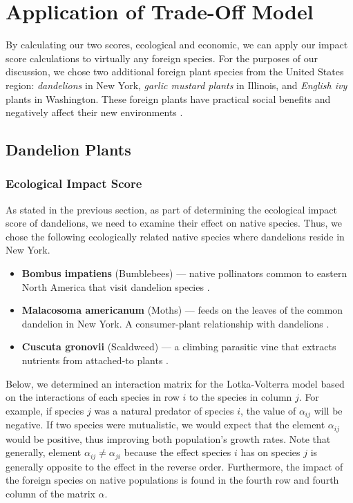 \section{Application of Trade-Off Model}

By calculating our two scores, ecological and economic, we can apply our impact score calculations to virtually any foreign species. For the purposes of our discussion, we chose two additional foreign plant species from the United States region: \textit{dandelions} in New York, \textit{garlic mustard plants} in Illinois, and  \textit{English ivy} plants in Washington. These foreign plants have practical social benefits and negatively affect their new environments \cite{columbiatribuneDandelionsFight, natureGarlicMustard, invasiveEnglishHedera}.

\subsection{Dandelion Plants}
\subsubsection{Ecological Impact Score}

As stated in the previous section, as part of determining the ecological impact score of dandelions, we need to examine their effect on native species. Thus, we chose the following ecologically related native species where dandelions reside in New York.

\begin{itemize}
    \item \textbf{Bombus impatiens} (Bumblebees) — native pollinators common to eastern North America that visit dandelion species \cite{nwfCommonEastern}.
    \item \textbf{Malacosoma americanum} (Moths) — feeds on the leaves of the common dandelion in New York. A consumer-plant relationship with dandelions \cite{butterfliesandmothsEasternTent}.
    \item \textbf{Cuscuta gronovii} (Scaldweed) — a climbing parasitic vine that extracts nutrients from attached-to plants \cite{minnesotawildflowersCuscutaGronovii}.
\end{itemize}

Below, we determined an interaction matrix for the Lotka-Volterra model based on the interactions of each species in row \(i\) to the species in column \(j\). For example, if species \(j\) was a natural predator of species \(i\), the value of \(\alpha_{ij}\) will be negative. If two species were mutualistic, we would expect that the element \(\alpha_{ij}\) would be positive, thus improving both population's growth rates. Note that generally, element \(\alpha_{ij} \neq \alpha_{ji}\) because the effect species \(i\) has on species \(j\) is generally opposite to the effect in the reverse order. Furthermore, the impact of the foreign species on native populations is found in the fourth row and fourth column of the matrix \(\alpha\).

